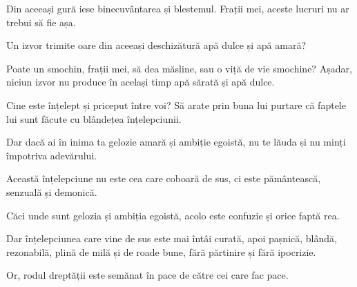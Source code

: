 {Din aceeași gură iese binecuvântarea și blestemul. Frații mei, aceste lucruri nu ar trebui să fie așa.

Un izvor trimite oare din aceeași deschizătură apă dulce și apă amară?

Poate un smochin, frații mei, să dea măsline, sau o viță de vie smochine? Așadar, niciun izvor nu produce în același timp apă sărată și apă dulce.


\par }{\PP {}Cine este înțelept și priceput între voi? Să arate prin buna lui purtare că faptele lui sunt făcute cu blândețea înțelepciunii.

Dar dacă ai în inima ta gelozie amară și ambiție egoistă, nu te lăuda și nu minți împotriva adevărului.

Această înțelepciune nu este cea care coboară de sus, ci este pământească, senzuală și demonică.

Căci unde sunt gelozia și ambiția egoistă, acolo este confuzie și orice faptă rea.

Dar înțelepciunea care vine de sus este mai întâi curată, apoi pașnică, blândă, rezonabilă, plină de milă și de roade bune, fără părtinire și fără ipocrizie.

Or, rodul dreptății este semănat în pace de către cei care fac pace.



\par }
